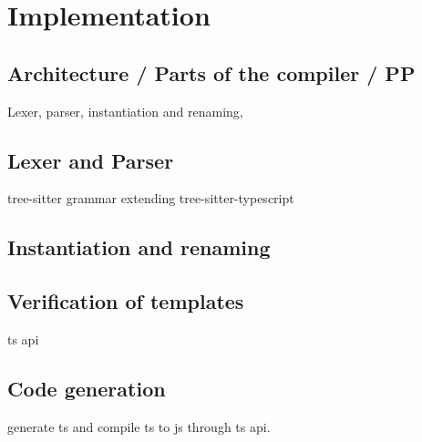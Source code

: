 
\chapter{Implementation}\label{ch:implementation}

\section{Architecture / Parts of the compiler / PP}

Lexer, parser, instantiation and renaming,

\section{Lexer and Parser}

tree-sitter grammar extending tree-sitter-typescript

\section{Instantiation and renaming}

\section{Verification of templates}

ts api

\section{Code generation}

generate ts and compile ts to js through ts api.

